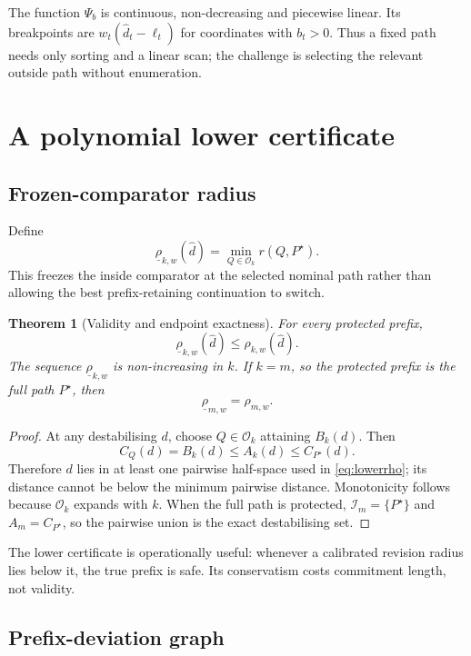 \documentclass[11pt]{article}
\newtheorem{theorem}{Theorem}[section]
\theoremstyle{definition}
\newcommand{\cI}{\mathcal{I}}
\newcommand{\cO}{\mathcal{O}}
\newcommand{\dhat}{\widehat d}
\newcommand{\ellv}{\ell}
\begin{document}
The function $\Psi_b$ is continuous, non-decreasing and piecewise linear. Its breakpoints are $w_t(\dhat_t-\ellv_t)$ for coordinates with $b_t>0$. Thus a fixed path needs only sorting and a linear scan; the challenge is selecting the relevant outside path without enumeration.

\section{A polynomial lower certificate}

\subsection{Frozen-comparator radius}

Define
\begin{equation}\label{eq:lowerrho}
\underline\rho_{k,w}(\dhat)=
\min_{Q\in\cO_k} r(Q,P^\star).
\end{equation}
This freezes the inside comparator at the selected nominal path rather than allowing the best prefix-retaining continuation to switch.

\begin{theorem}[Validity and endpoint exactness]\label{thm:lower}
For every protected prefix,
\begin{equation}\label{eq:lowerineq}
\underline\rho_{k,w}(\dhat)\le\rho_{k,w}(\dhat).
\end{equation}
The sequence $\underline\rho_{k,w}$ is non-increasing in $k$. If $k=m$, so the protected prefix is the full path $P^\star$, then
\[
\underline\rho_{m,w}=\rho_{m,w}.
\]
\end{theorem}

\begin{proof}
At any destabilising $d$, choose $Q\in\cO_k$ attaining $B_k(d)$. Then
\[
C_Q(d)=B_k(d)\le A_k(d)\le C_{P^\star}(d).
\]
Therefore $d$ lies in at least one pairwise half-space used in \eqref{eq:lowerrho}; its distance cannot be below the minimum pairwise distance. Monotonicity follows because $\cO_k$ expands with $k$. When the full path is protected, $\cI_m=\{P^\star\}$ and $A_m=C_{P^\star}$, so the pairwise union is the exact destabilising set.
\end{proof}

The lower certificate is operationally useful: whenever a calibrated revision radius lies below it, the true prefix is safe. Its conservatism costs commitment length, not validity.

\subsection{Prefix-deviation graph}
\end{document}
